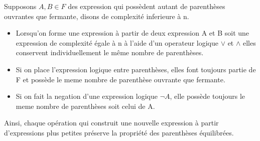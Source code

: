 \documentclass[16pt]{report}
\begin{document}
\begin{multicols*}{2}
\begin{enumerate}
        Supposons $A, B \in  F$ des expression qui possèdent autant de parenthèses ouvrantes que fermante, disons de complexité inferieure à n. \\
        \begin{itemize}

        \item Lorsqu'on forme une expression à partir de deux expression A et B soit une expression de complexité égale à n à l'aide d'un operateur logique $\lor$ et $\land$ elles conservent individuellement le même nombre de parenthèses. \\ 

        \item Si on place l'expression logique entre parenthèses, elles font toujours partie de F et possède le meme nombre de parenthèse ouvrante que fermante. \\

        \item Si on fait la negation d'une expression logique $\lnot A$, elle possède toujours le meme nombre de parenthèses soit celui de A. \\
        \end{itemize}

        Ainsi, chaque opération qui construit une nouvelle expression à partir d'expressions plus petites préserve la propriété des parenthèses équilibrées.
        \end{enumerate}
        \end{multicols*}  
\end{document}
